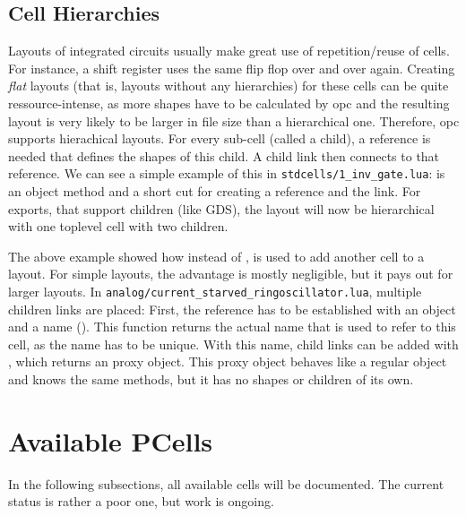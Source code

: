 \subsection{Cell Hierarchies}
Layouts of integrated circuits usually make great use of repetition/reuse of cells. For instance, a shift register uses the same flip flop over and over again.
Creating \emph{flat} layouts (that is, layouts without any hierarchies) for these cells can be quite ressource-intense, as more shapes have to be calculated by
opc and the resulting layout is very likely to be larger in file size than a hierarchical one. Therefore, opc supports hierachical layouts. For every sub-cell
(called a child), a reference is needed that defines the shapes of this child. A child link then connects to that reference. We can see a simple example of this
in \texttt{stdcells/1\_inv\_gate.lua}:
 is an object method and a short cut for creating a reference and the link. For exports, that support children (like GDS), the layout will
now be hierarchical with one toplevel cell with two children. 

The above example showed how instead of ,  is used to add another cell to a layout. For simple layouts, the
advantage is mostly negligible, but it pays out for larger layouts. In \texttt{analog/current\_starved\_ringoscillator.lua}, multiple children links are placed:
First, the reference has to be established with an object and a name (). This function returns the actual name that is used to
refer to this cell, as the name has to be unique. With this name, child links can be added with , which returns an proxy object. This
proxy object behaves like a regular object and knows the same methods, but it has no shapes or children of its own.

\section{Available PCells}
In the following subsections, all available cells will be documented. The current status is rather a poor one, but work is ongoing.
